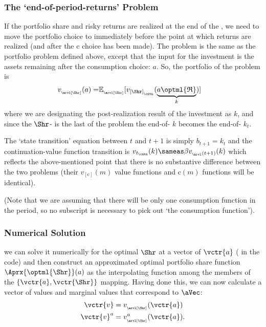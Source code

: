\documentclass[titlepage, headings=optiontotocandhead]{econtex}
\begin{document}
\subsubsection{The `end-of-period-returns' Problem}

If the portfolio share and risky returns are realized at the end of the {\interval}, we need to move the portfolio choice {\stg} to immediately before the point at which returns are realized (and after the $\mathrm{c}$ choice has been made).  The problem is the same as the portfolio problem defined above, except that the input for the investment {\stg} is the assets remaining after the consumption choice: $a$.  So, the portfolio {\stg} of the problem is
\begin{equation}\begin{gathered}\begin{aligned}
  v_{_\arvl[\Shr]}(a) = & {\mathbb{E}}_{_\arvl[\Shr]}[v_{[\Shr]_{_\cntn}}(\underbrace{a\optml{\mathfrak{R}}}_{k})] %
    \end{aligned}\end{gathered}\end{equation}
where we are designating the post-realization result of the investment as $k$, and since the $\Shr$-{\stg} is the last {\stg} of the problem the end-of-{\stg} $k$ becomes the end-of-{\interval} $k_{t}.$ 

The `state transition' equation between $t$ and $t+1$ is simply $b_{t+1} = k_{t}$ and the continuation-value function transition is $v_{t_\cntn}(k) \sameas \beta v_{_\arvl(t+1)}(k)$ which reflects the above-mentioned point that there is no substantive difference between the two problems (their $v_{[\mathrm{c}]}(m)$ value functions and $\mathrm{c}(m)$ functions will be identical).

(Note that we are assuming that there will be only one consumption function in the period, so no {\stg} subscript is necessary to pick out `the consumption function'). 

\subsubsection{Numerical Solution}
we can solve it numerically for the optimal $\Shr$ at a vector of $\vctr{a}$ ({\aVecCode} in the code)  and then construct an approximated optimal portfolio share function $\Aprx{\optml{\Shr}}(a)$ as the interpolating function among the members of the $\{\vctr{a},\vctr{\Shr}\}$ mapping.  Having done this, we can now calculate a vector of values and marginal values that correspond to $\aVec$:
\begin{equation}\begin{gathered}\begin{aligned}
      \vctr{v}  & = v_{_\arvl[\Shr]}(\vctr{a}) \label{eq:vShrEnd}
\\      \vctr{v}^a  & = v^{a}_{_\arvl[\Shr]}(\vctr{a}).
    \end{aligned}\end{gathered}\end{equation}
\end{document}
